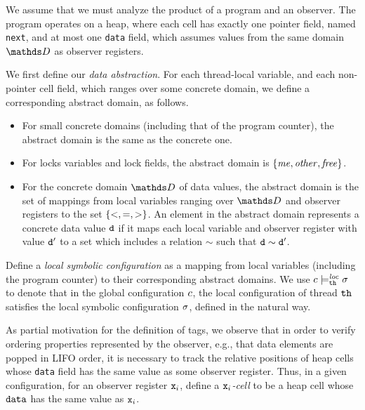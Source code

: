 
We assume that we must analyze the product of a program and an observer.
The program operates on a heap, where each cell has exactly one
pointer field, named {\tt next}, and at most one {\tt data} field, which
assumes values from the same domain $\ddomain$ as observer registers.


We first define our {\em data abstraction}.
For each thread-local variable, and each non-pointer cell field, which ranges
over some concrete domain, we define a corresponding abstract domain,
as follows.
\begin{itemize}
\item For small concrete domains (including that of the program counter),
  the abstract domain is the same as the concrete one.
\item
  For locks variables and lock fields, the abstract domain is $\left\{\mathit{me},\mathit{other},\mathit{free}\right\}$.
\item For the concrete domain $\ddomain$ of data values, the abstract domain
  is the set of mappings from local variables ranging over $\ddomain$ and
  observer registers to the set $\left\{<,=,>\right\}$.
  An element in the abstract domain represents a concrete data value $\tt d$
  if
    it maps each local variable and observer register with value $\tt d'$
    to a set which includes a relation
    $\sim$ such that $\tt d \sim \tt d'$.
\end{itemize}
Define a {\em local symbolic configuration} as a mapping from local
variables (including the program counter) to their corresponding abstract
domains.
We use $c \models_{{\tt th}}^{\mathit{loc}} \sigma$ to denote that in the
global configuration $c$, the
local configuration of thread ${\tt th}$ satisfies the local symbolic
configuration $\sigma$, defined in the natural way.

As partial motivation for the definition of tags, we
observe that in order to verify ordering properties represented by the
observer, e.g., that data elements are popped in LIFO order, it is necessary to
track the relative positions of heap cells whose {\tt data} field has the same
value as some observer register. Thus,   in a given configuration,
for an observer register $\mathtt{x}_i$,  define a
{\em $\mathtt{x}_i$-cell} to be a heap cell whose
${\tt data}$ has the same value as $\mathtt{x}_i$.

